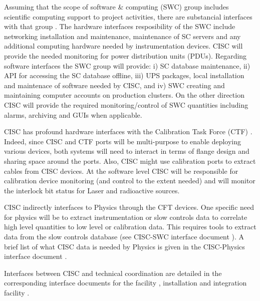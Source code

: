 

Assuming that the scope of software \& computing (SWC) group includes scientific computing support to project activities, there are substancial interfaces with that group \cite{bib:docdb7126}. 
The hardware interfaces resposibility of the SWC include networking installation and maintenance,
maintenance of SC servers and any additional computing hardware needed by instrumentation devices.
CISC will provide the needed monitoring for power distribution units (PDUs). Regarding software interfaces the SWC group will provide:
i) SC database maintenance, ii) API for accessing the SC database offline,
iii) UPS packages, local installation and maintenace of software needed by CISC, and iv) SWC creating and maintaining computer accounts on production clusters. 
On the other direction CISC will provide the required monitoring/control of SWC quantities including alarms, archiving and GUIs when applicable. 


CISC has profound hardware interfaces with the Calibration Task Force (CTF) \cite{bib:docdb7072}. Indeed, since CISC and CTF ports will be multi-purpose to enable deploying various devices,
both systems will need to interact in terms of flange design and sharing space around the ports. Also, CISC might use calibration ports to extract cables from CISC devices. 
At the software level CISC will be responsible for calibration device monitoring (and control to the extent needed) and will 
monitor the interlock bit status for Laser and radioactive sources. 

CISC indirectly interfaces to Physics through the CFT devices. One specific need for physics will be to extract
instrumentation or slow controls data to correlate high level quantities to low level or calibration data.
This requires tools to extract data from the slow controls database (see CISC-SWC interface document \cite{bib:docdb7126}).
A brief list of what CISC data is needed by Physics is given in the CISC-Physics interface document \cite{bib:docdb7099}. 

Interfaces between CISC and technical coordination are detailed in the corresponding interface documents for the facility \cite{bib:docdb6991}, installation \cite{bib:docdb7018}
and integration facility \cite{bib:docdb7045}.

